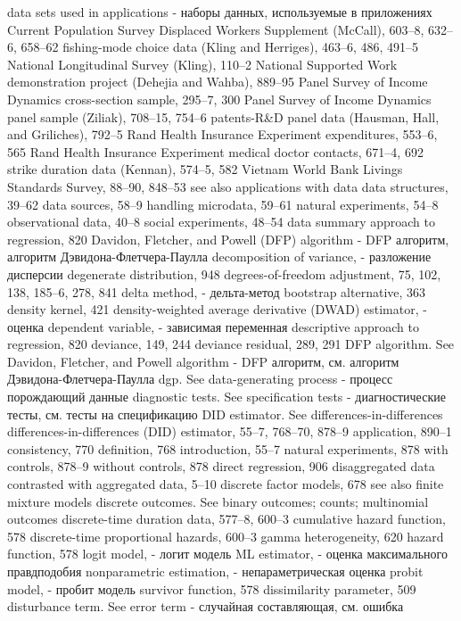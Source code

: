 data sets used in applications - наборы данных, используемые в приложениях
Current Population Survey Displaced Workers Supplement (McCall), 603–8, 632–6, 658–62
fishing-mode choice data (Kling and Herriges), 463–6, 486, 491–5
National Longitudinal Survey (Kling), 110–2 National Supported Work demonstration project
(Dehejia and Wahba), 889–95
Panel Survey of Income Dynamics cross-section
sample, 295–7, 300
Panel Survey of Income Dynamics panel sample
(Ziliak), 708–15, 754–6
patents-R&D panel data (Hausman, Hall, and
Griliches), 792–5
Rand Health Insurance Experiment expenditures,
553–6, 565
Rand Health Insurance Experiment medical doctor
contacts, 671–4, 692
strike duration data (Kennan), 574–5, 582 Vietnam World Bank Livings Standards Survey,
88–90, 848–53
see also applications with data
data structures, 39–62
data sources, 58–9 handling microdata, 59–61 natural experiments, 54–8 observational data, 40–8 social experiments, 48–54
data summary approach to regression, 820
Davidon, Fletcher, and Powell (DFP) algorithm - DFP алгоритм, алгоритм Дэвидона-Флетчера-Паулла
decomposition of variance, - разложение дисперсии
degenerate distribution, 948
degrees-of-freedom adjustment, 75, 102, 138, 185–6,
278, 841
delta method, - дельта-метод
bootstrap alternative, 363
density kernel, 421
density-weighted average derivative (DWAD)
estimator, - оценка
dependent variable, - зависимая переменная
descriptive approach to regression, 820
deviance, 149, 244
deviance residual, 289, 291
DFP algorithm. See Davidon, Fletcher, and Powell
algorithm - DFP алгоритм, см. алгоритм Дэвидона-Флетчера-Паулла
dgp. See data-generating process - процесс порождающий данные
diagnostic tests. See specification tests - диагностические тесты, см. тесты на спецификацию
DID estimator. See differences-in-differences differences-in-differences (DID) estimator, 55–7,
768–70, 878–9 application, 890–1 consistency, 770 definition, 768 introduction, 55–7 natural experiments, 878 with controls, 878–9 without controls, 878
direct regression, 906 disaggregated data
contrasted with aggregated data, 5–10 discrete factor models, 678
see also finite mixture models
discrete outcomes. See binary outcomes; counts;
multinomial outcomes
discrete-time duration data, 577–8, 600–3
cumulative hazard function, 578 discrete-time proportional hazards, 600–3 gamma heterogeneity, 620
hazard function, 578
logit model, - логит модель
ML estimator, - оценка максимального правдподобия
nonparametric estimation, - непараметрическая оценка
probit model, - пробит модель
survivor function, 578
dissimilarity parameter, 509
disturbance term. See error term - случайная составляющая, см. ошибка

